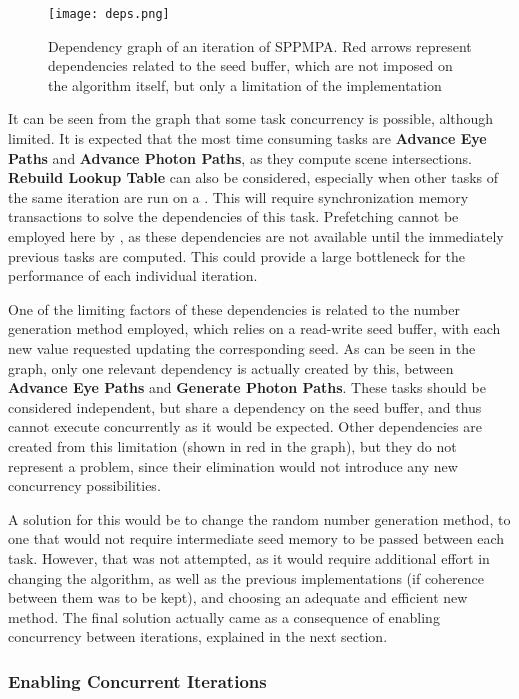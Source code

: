 \documentclass[main.tex]{subfiles}
\begin{document}
\begin{figure}[!htp]
  \centering
  \texttt{[image: deps.png]}
  \caption[Dependency graph of an iteration of SPPMPA]{Dependency graph of an iteration of SPPMPA. Red arrows represent dependencies related to the seed buffer, which are not imposed on the algorithm itself, but only a limitation of the implementation \label{fig:deps}}
\end{figure}

It can be seen from the graph that some task concurrency is possible, although limited. It is expected that the most time consuming tasks are \textbf{Advance Eye Paths} and \textbf{Advance Photon Paths}, as they compute scene intersections. \textbf{Rebuild Lookup Table} can also be considered, especially when other tasks of the same iteration are run on a \gpu. This will require synchronization memory transactions to solve the dependencies of this task. Prefetching cannot be employed here by \starpu, as these dependencies are not available until the immediately previous tasks are computed. This could provide a large bottleneck for the performance of each individual iteration.

One of the limiting factors of these dependencies is related to the number generation method employed, which relies on a read-write seed buffer, with each new value requested updating the corresponding seed. As can be seen in the graph, only one relevant dependency is actually created by this, between \textbf{Advance Eye Paths} and \textbf{Generate Photon Paths}. These tasks should be considered independent, but share a dependency on the seed buffer, and thus cannot execute concurrently as it would be expected. Other dependencies are created from this limitation (shown in red in the graph), but they do not represent a problem, since their elimination would not introduce any new concurrency possibilities.

A solution for this would be to change the random number generation method, to one that would not require intermediate seed memory to be passed between each task. However, that was not attempted, as it would require additional effort in changing the algorithm, as well as the previous implementations (if coherence between them was to be kept), and choosing an adequate and efficient new method. The final solution actually came as a consequence of enabling concurrency between iterations, explained in the next section.


\subsubsection{Enabling Concurrent Iterations} \label{section:starpu_concurrent_iters}
\end{document}
